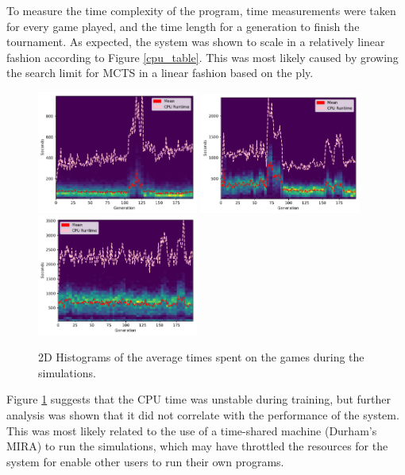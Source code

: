 \documentclass[12pt,a4paper]{article}
\begin{document}
            To measure the time complexity of the program, time measurements were taken for every game played, and the time length for a generation to finish the tournament. As expected, 
            the system was shown to scale in a relatively linear fashion according to Figure \ref{cpu_table}. This was most likely caused by growing the search limit for MCTS in a linear fashion based on the ply.

            \begin{figure}[!ht]
                \centering
                \includegraphics[width=53mm]{images/results/1ply/simulation_timings.pdf}
                \includegraphics[width=53mm]{images/results/3ply/simulation_timings.pdf}
                \includegraphics[width=53mm]{images/results/6ply/simulation_timings.pdf}
                \caption{2D Histograms of the average times spent on the games during the simulations. \label{chart_cpu_times}}
            \end{figure}

            Figure \ref{chart_cpu_times} suggests that the CPU time was unstable during training, but further analysis was shown that it did not correlate with the performance of the system. This was most likely related to the use of a time-shared machine (Durham's MIRA) to run the simulations, which may have throttled the resources for the system for enable other users to run their own programs. %
\end{document}
